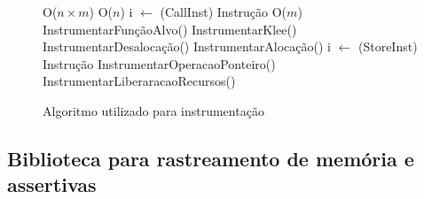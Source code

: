 \begin{figure}[H]
	\caption{\label{fig:algoritmo_instrumentacao} Algoritmo utilizado para instrumentação}
	\begin{center}
\begin{algorithmic}[1] 
         \Comment O($n \times m$)
             \Comment O($n$) 
                        	\State i $\gets$ (CallInst) Instrução
                             \Comment O($m$)
                            	\State InstrumentarFunçãoAlvo() 
                            \EndIf                           
                               \State InstrumentarKlee() 
                            \EndCase
                                \State InstrumentarDesalocação() 
                            \EndCase
                                    \State InstrumentarAlocação()
                                \EndCase                                
                            \EndSwitch
                        \EndCase
                        	\State i $\gets$ (StoreInst) Instrução
                            	\State InstrumentarOperacaoPonteiro()  
                            \EndIf
                        \EndCase
                    \EndSwitch
                 \EndFor                            
            	\State InstrumentarLiberaracaoRecursos() 
            \EndIf
        \EndFunction
\end{algorithmic}
	\end{center}
\end{figure}


\subsection{Biblioteca para rastreamento de memória e assertivas}
\label{sub:biblioteca}

